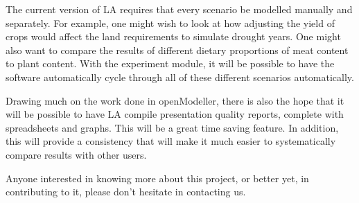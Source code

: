   The current version of LA requires that every scenario be modelled
  manually and separately.  For example, one might wish to look at how adjusting
  the yield of crops would affect the land requirements to simulate drought
  years.  One might also want to compare the results of different dietary
  proportions of meat content to plant content.  With the experiment module, it
  will be possible to have the software automatically cycle through all of these
  different scenarios automatically.
  
  Drawing much on the work done in openModeller, there is also the hope that it
  will be possible to have LA compile presentation quality reports,
  complete with spreadsheets and graphs.  This will be a great time saving
  feature.  In addition, this will provide a consistency that will make it much
  easier to systematically compare results with other users.
  
  Anyone interested in knowing more about this project, or better yet, in
  contributing to it, please don't hesitate in contacting us.











\begin{footnotesize}



\end{footnotesize}


\address{Jason Jorgenson\\ University of Liverpool\\
\url{http://www.arkygeek.com} (under development)\\
}

\address{Tim Sutton\\ Centro de Referncia em Informao Ambiental, CRIA\\
\url{http://cria.org.br}\\
}

